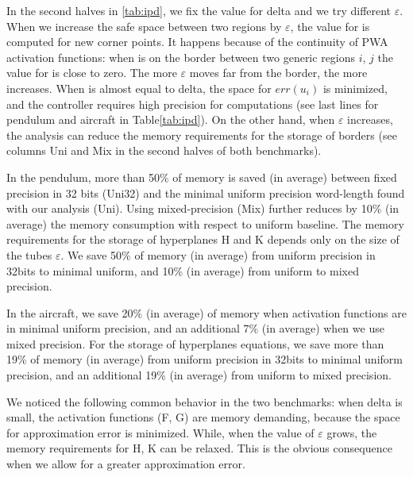 In the second halves in \autoref{tab:ipd}, we fix the value for delta and we try different $\varepsilon$. When we increase the safe space between two regions by $\varepsilon$, the value for \maxUij is computed for new corner points. It happens because of the continuity of PWA activation functions: when \statevarmath is on the border between two generic regions $i$, $j$ the value for \maxUij is close to zero. The more $\varepsilon$ moves \statevarmath far from the border, the more \maxUij increases. When \maxUij is almost equal to delta, the space for $err(u_{i})$ is minimized, and the controller requires high precision for computations (see last lines for pendulum and aircraft in Table\ref{tab:ipd}). On the other hand, when $\varepsilon$ increases, the analysis can reduce the memory requirements for the storage of borders (see columns Uni and Mix in the second halves of both benchmarks).

In the pendulum, more than 50\% of memory is saved (in average) between fixed precision in 32 bits (Uni32) and the minimal uniform precision word-length found with our analysis (Uni). Using mixed-precision (Mix) further reduces by 10\% (in average) the memory consumption with respect to uniform baseline. The memory requirements for the storage of hyperplanes H and K depends only on the size of the tubes $\varepsilon$. We save 50\% of memory (in average) from uniform precision in 32bits to minimal uniform, and 10\% (in average) from uniform to mixed precision. 

In the aircraft, we save 20\% (in average) of memory when activation functions are in minimal uniform precision, and an additional 7\% (in average) when we use mixed precision. For the storage of hyperplanes equations, we save more than 19\% of memory (in average) from uniform precision in 32bits to minimal uniform precision, and an additional 19\% (in average) from uniform to mixed precision. 

We noticed the following common behavior in the two benchmarks: when delta is small, the activation functions (F, G) are memory demanding, because the space for approximation error is minimized. While, when the value of $\varepsilon$ grows, the memory requirements for H, K can be relaxed. This is the obvious consequence when we allow for a greater approximation error.

